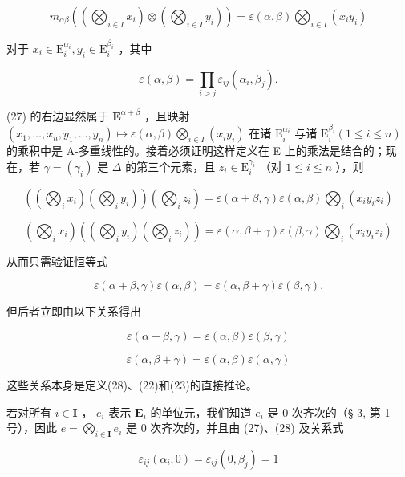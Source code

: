 \[
m _ {\alpha \beta} \left(\left(\bigotimes_ {i \in I} x _ {i}\right) \otimes \left(\bigotimes_ {i \in I} y _ {i}\right)\right) = \varepsilon (\alpha , \beta) \bigotimes_ {i \in I} (x _ {i} y _ {i})\tag{27}
\]

对于 \(x_{i}\in \mathrm{E}_{i}^{\alpha_{i}},y_{i}\in \mathrm{E}_{i}^{\beta_{i}}\) ，其中

\[
\varepsilon (\alpha , \beta) = \prod_ {i > j} \varepsilon_ {i j} (\alpha_ {i}, \beta_ {j}).\tag{28}
\]

(27) 的右边显然属于 \(\mathbf{E}^{\alpha +\beta}\) ，且映射 \((x_{1},\ldots ,x_{n},y_{1},\ldots ,y_{n})\mapsto \varepsilon (\alpha ,\beta)\bigotimes_{i\in I}(x_{i}y_{i})\) 在诸 \(\mathrm{E}_i^{\alpha_i}\) 与诸 \(\mathrm{E}_i^{\beta_i}(1\leqslant i\leqslant n)\) 的乘积中是 A-多重线性的。接着必须证明这样定义在 E 上的乘法是结合的；现在，若 \(\gamma = (\gamma_{i})\) 是 \(\Delta\) 的第三个元素，且 \(z_{i} \in \mathrm{E}_{i}^{\gamma_{i}}\) （对 \(1 \leqslant i \leqslant n\) ），则

\[
\left(\left(\bigotimes_ {i} x _ {i}\right) \left(\bigotimes_ {i} y _ {i}\right)\right) \left(\bigotimes_ {i} z _ {i}\right) = \varepsilon (\alpha + \beta , \gamma) \varepsilon (\alpha , \beta) \bigotimes_ {i} (x _ {i} y _ {i} z _ {i})
\]

\[
\left(\bigotimes_ {i} x _ {i}\right) \left(\left(\bigotimes_ {i} y _ {i}\right) \left(\bigotimes_ {i} z _ {i}\right)\right) = \varepsilon (\alpha , \beta + \gamma) \varepsilon (\beta , \gamma) \bigotimes_ {i} (x _ {i} y _ {i} z _ {i})
\]

从而只需验证恒等式

\[
\varepsilon (\alpha + \beta , \gamma) \varepsilon (\alpha , \beta) = \varepsilon (\alpha , \beta + \gamma) \varepsilon (\beta , \gamma).
\]

但后者立即由以下关系得出

\[
\varepsilon (\alpha + \beta , \gamma) = \varepsilon (\alpha , \beta) \varepsilon (\beta , \gamma)
\]

\[
\varepsilon (\alpha , \beta + \gamma) = \varepsilon (\alpha , \beta) \varepsilon (\alpha , \gamma)
\]

这些关系本身是定义(28)、(22)和(23)的直接推论。

若对所有 \(i \in \mathbf{I}\) ， \(e_i\) 表示 \(\mathbf{E}_i\) 的单位元，我们知道 \(e_i\) 是 0 次齐次的（§ 3, 第 1 号），因此 \(e = \bigotimes_{i \in \mathbf{I}} e_i\) 是 0 次齐次的，并且由 (27)、(28) 及关系式

\[
\varepsilon_ {i j} (\alpha_ {i}, 0) = \varepsilon_ {i j} (0, \beta_ {j}) = 1
\]

